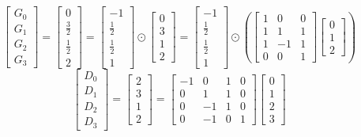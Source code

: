 \documentclass{article}%
\begin{document}
\[%
\left[\begin{matrix}G_{0}\\G_{1}\\G_{2}\\G_{3}\end{matrix}\right] = \left[\begin{matrix}0\\\frac{3}{2}\\\frac{1}{2}\\2\end{matrix}\right] = \left[\begin{matrix}-1\\\frac{1}{2}\\\frac{1}{2}\\1\end{matrix}\right] \odot \left[\begin{matrix}0\\3\\1\\2\end{matrix}\right] = \left[\begin{matrix}-1\\\frac{1}{2}\\\frac{1}{2}\\1\end{matrix}\right] \odot \left( \left[\begin{matrix}1 & 0 & 0\\1 & 1 & 1\\1 & -1 & 1\\0 & 0 & 1\end{matrix}\right] \left[\begin{matrix}0\\1\\2\end{matrix}\right] \right)%
\]%
\[%
\left[\begin{matrix}D_{0}\\D_{1}\\D_{2}\\D_{3}\end{matrix}\right] = \left[\begin{matrix}2\\3\\1\\2\end{matrix}\right] = \left[\begin{matrix}-1 & 0 & 1 & 0\\0 & 1 & 1 & 0\\0 & -1 & 1 & 0\\0 & -1 & 0 & 1\end{matrix}\right] \left[\begin{matrix}0\\1\\2\\3\end{matrix}\right]%
\]%
\end{document}
